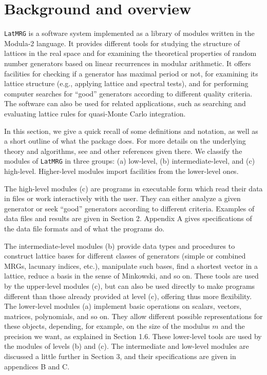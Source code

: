 \section {Background and overview}

{\tt LatMRG} is a software system implemented as a library of modules
written in the Modula-2 language.
It provides different tools for studying the structure of lattices 
in the real space and
for examining the theoretical properties of random number
generators based on linear recurrences in modular arithmetic.
It offers facilities for checking if a generator has maximal period or not,
for examining its lattice structure 
(e.g., applying lattice and spectral tests),
and for performing computer searches for ``good'' generators
according to different quality criteria.
The software can also be used for related applications, such as 
searching and evaluating lattice rules for quasi-Monte Carlo integration.

In this section, we give a quick recall of some definitions and
notation, as well as a short outline of what the package does.
For more details on the underlying theory and algorithms,
see \cite{rLEC97c} and other references given there.
We classify the modules of {\tt LatMRG} in three groups:
(a) low-level, (b) intermediate-level, and (c) high-level.
Higher-level modules import facilities from the lower-level ones.

The high-level modules (c) are programs in executable form
which read their data in files or work interactively with the user.
They can either analyze a given generator or seek ``good'' generators
according to different criteria.
Examples of data files and results are given in Section 2.
Appendix A gives specifications of the data file formats 
and of what the programs do.

The intermediate-level modules (b) provide data types and procedures
to construct lattice bases for
different classes of generators (simple or combined MRGs, lacunary
indices, etc.), manipulate such bases, find a shortest vector in a
lattice, reduce a basis in the sense of Minkowski, and so on.
These tools are used by the upper-level modules (c), but can also be
used directly to make programs different than those already provided
at level (c), offering thus more flexibility.
The lower-level modules (a) implement basic operations on scalars, vectors,
matrices, polynomials, and so on.
They allow different possible representations for these objects,
depending, for example, on the size of the modulus $m$ and 
the precision we want, as explained in Section 1.6.
These lower-level tools are used by the modules of levels (b) and (c).
The intermediate and low-level modules are discussed a little further
in Section 3, and their specifications are given in appendices B and C.


